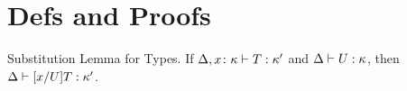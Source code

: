 
\section{Defs and Proofs}
\label{sec:defs-proofs}




Substitution Lemma for Types.
%
If $\isType[\Delta,x\colon\kind] T\kind'$ and $\isType U\kind$, then
$\isType{\subs xUT}{\kind'}$.


